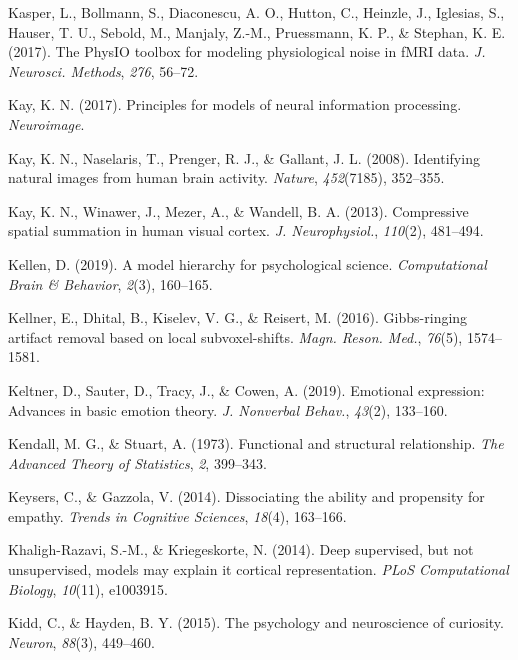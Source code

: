 \documentclass[11pt,american,a4paper,oneside,]{memoir} %
\begin{document}
\leavevmode\hypertarget{ref-Kasper2017-lp}{}%
Kasper, L., Bollmann, S., Diaconescu, A. O., Hutton, C., Heinzle, J., Iglesias, S., Hauser, T. U., Sebold, M., Manjaly, Z.-M., Pruessmann, K. P., \& Stephan, K. E. (2017). The PhysIO toolbox for modeling physiological noise in fMRI data. \emph{J. Neurosci. Methods}, \emph{276}, 56--72.

\leavevmode\hypertarget{ref-Kay2017-vr}{}%
Kay, K. N. (2017). Principles for models of neural information processing. \emph{Neuroimage}.

\leavevmode\hypertarget{ref-kay2008identifying}{}%
Kay, K. N., Naselaris, T., Prenger, R. J., \& Gallant, J. L. (2008). Identifying natural images from human brain activity. \emph{Nature}, \emph{452}(7185), 352--355.

\leavevmode\hypertarget{ref-Kay2013-ch}{}%
Kay, K. N., Winawer, J., Mezer, A., \& Wandell, B. A. (2013). Compressive spatial summation in human visual cortex. \emph{J. Neurophysiol.}, \emph{110}(2), 481--494.

\leavevmode\hypertarget{ref-Kellen2019-af}{}%
Kellen, D. (2019). A model hierarchy for psychological science. \emph{Computational Brain \& Behavior}, \emph{2}(3), 160--165.

\leavevmode\hypertarget{ref-Kellner2016-xb}{}%
Kellner, E., Dhital, B., Kiselev, V. G., \& Reisert, M. (2016). Gibbs-ringing artifact removal based on local subvoxel-shifts. \emph{Magn. Reson. Med.}, \emph{76}(5), 1574--1581.

\leavevmode\hypertarget{ref-Keltner2019-tm}{}%
Keltner, D., Sauter, D., Tracy, J., \& Cowen, A. (2019). Emotional expression: Advances in basic emotion theory. \emph{J. Nonverbal Behav.}, \emph{43}(2), 133--160.

\leavevmode\hypertarget{ref-kendall1973functional}{}%
Kendall, M. G., \& Stuart, A. (1973). Functional and structural relationship. \emph{The Advanced Theory of Statistics}, \emph{2}, 399--343.

\leavevmode\hypertarget{ref-keysers2014dissociating}{}%
Keysers, C., \& Gazzola, V. (2014). Dissociating the ability and propensity for empathy. \emph{Trends in Cognitive Sciences}, \emph{18}(4), 163--166.

\leavevmode\hypertarget{ref-khaligh2014deep}{}%
Khaligh-Razavi, S.-M., \& Kriegeskorte, N. (2014). Deep supervised, but not unsupervised, models may explain it cortical representation. \emph{PLoS Computational Biology}, \emph{10}(11), e1003915.

\leavevmode\hypertarget{ref-kidd2015psychology}{}%
Kidd, C., \& Hayden, B. Y. (2015). The psychology and neuroscience of curiosity. \emph{Neuron}, \emph{88}(3), 449--460.
\end{document}
